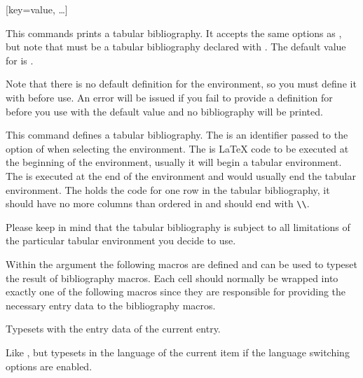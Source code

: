 \documentclass[DIV=9]{scrartcl}
\def\latex{LaTeX}%
\begin{document}
\begin{ltxsyntax}
[key=value, \dots]

This commands prints a tabular bibliography.
It accepts the same options as , but note that
 must be a tabular bibliography declared with
.
The default value for  is .

\begin{warnbox}
Note that there is no default definition for the
 environment, so you must define it with
 before use.
An error will be issued if you fail to provide a definition
for  before you use  with the default
 value and no bibliography will be printed.
\end{warnbox}


This command defines a tabular bibliography.
The  is an identifier passed to the  option of
 when selecting the environment.
The  is \latex{} code to be executed at the beginning of the
environment, usually it will begin a tabular environment.
The  is executed at the end of the environment and would
usually end the tabular environment.
The  holds the code for one row in the tabular bibliography,
it should have no more columns than ordered in  and should
end with \lstinline|\\|.

\begin{remindbox}
Please keep in mind that the tabular bibliography is subject to all limitations
of the particular tabular environment you decide to use.
\end{remindbox}

Within the  argument the following macros are defined and can be
used to typeset the result of bibliography macros.
Each cell should normally be wrapped into exactly one of the following macros
since they are responsible for providing the necessary entry data to the
bibliography macros.


Typesets  with the entry data of the current entry.


Like , but typesets  in the language of the current
item if the language switching options are enabled.


\end{ltxsyntax}
\end{document}
